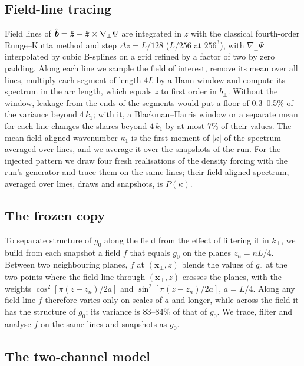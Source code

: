 \subsection{Field-line tracing}

Field lines of $\hat{\boldsymbol b}=\hat{\boldsymbol z}+\hat{\boldsymbol z}\times\nabla_\perp\Psi$ are integrated in $z$ with the classical fourth-order Runge--Kutta method and step $\Delta z=L/128$ ($L/256$ at $256^3$), with $\nabla_\perp\Psi$ interpolated by cubic B-splines on a grid refined by a factor of two by zero padding. Along each line we sample the field of interest, remove its mean over all lines, multiply each segment of length $4L$ by a Hann window and compute its spectrum in the arc length, which equals $z$ to first order in $b_\perp$. Without the window, leakage from the ends of the segments would put a floor of 0.3--0.5\% of the variance beyond $4\,k_1$; with it, a Blackman--Harris window or a separate mean for each line changes the shares beyond $4\,k_1$ by at most 7\% of their values. The mean field-aligned wavenumber $\kappa_1$ is the first moment of $|\kappa|$ of the spectrum averaged over lines, and we average it over the snapshots of the run. For the injected pattern we draw four fresh realisations of the density forcing with the run's generator and trace them on the same lines; their field-aligned spectrum, averaged over lines, draws and snapshots, is $P(\kappa)$.

\subsection{The frozen copy}\label{app:frozencopy}

To separate structure of $g_0$ along the field from the effect of filtering it in $k_\perp$, we build from each snapshot a field $f$ that equals $g_0$ on the planes $z_n=nL/4$. Between two neighbouring planes, $f$ at $(\boldsymbol x_\perp,z)$ blends the values of $g_0$ at the two points where the field line through $(\boldsymbol x_\perp,z)$ crosses the planes, with the weights $\cos^2[\pi(z-z_n)/2a]$ and $\sin^2[\pi(z-z_n)/2a]$, $a=L/4$. Along any field line $f$ therefore varies only on scales of $a$ and longer, while across the field it has the structure of $g_0$; its variance is 83--84\% of that of $g_0$. We trace, filter and analyse $f$ on the same lines and snapshots as $g_0$.

\subsection{The two-channel model}\label{app:model}

